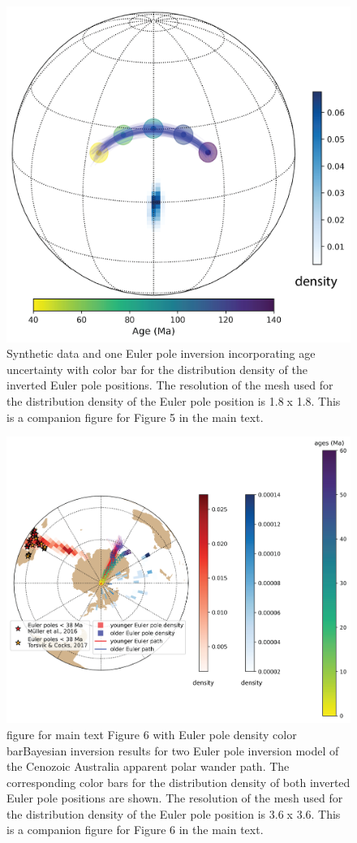 \documentclass[11pt,letterpaper]{article}
\begin{document}
\begin{figure}[h!]
\centering
\noindent\includegraphics[width=.5\textwidth]{SI_inversion_with_age_uncertainties.png}
\caption[Companion figure for main text Figure 5 with Euler pole density color bar]{Synthetic data and one Euler pole inversion incorporating age uncertainty with color bar for the distribution density of the inverted Euler pole positions. The resolution of the mesh used for the distribution density of the Euler pole position is 1.8\textdegree$\;$x 1.8\textdegree. This is a companion figure for Figure 5 in the main text. }
\label{pdffiguresample}
\end{figure}

\begin{figure}[h!]
\noindent\includegraphics[width=.8\textwidth]{SI_aus_inversion.png}
\captionCompanion figure for main text Figure 6 with Euler pole density color bar{Bayesian inversion results for two Euler pole inversion model of the Cenozoic Australia apparent polar wander path. The corresponding color bars for the distribution density of both inverted Euler pole positions are shown. The resolution of the mesh used for the distribution density of the Euler pole position is 3.6\textdegree$\;$x 3.6\textdegree. This is a companion figure for Figure 6 in the main text. }
\label{pdffiguresample}
\end{figure}
\end{document}
